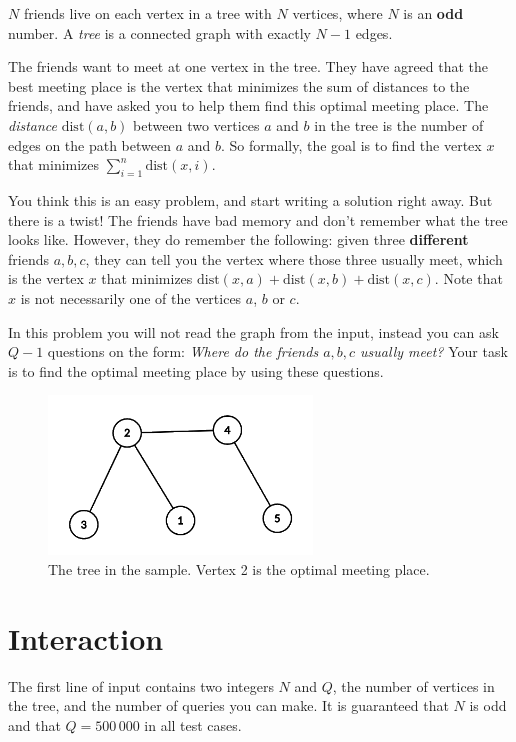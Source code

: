 $N$ friends live on each vertex in a tree with $N$ vertices, where $N$ is an \textbf{odd} number.
A \emph{tree} is a connected graph with exactly $N-1$ edges.

The friends want to meet at one vertex in the tree.
They have agreed that the best meeting place is the vertex that minimizes
the sum of distances to the friends, and have asked you to help them find 
this optimal meeting place.
The \emph{distance} $\text{dist}(a,b)$ between two vertices $a$ and $b$ in the tree is 
the number of edges on the path between $a$ and $b$.
So formally, the goal is to find the vertex $x$ that minimizes 
$\sum_{i=1}^{n} \text{dist}(x,i)$.

You think this is an easy problem, and start writing a solution right away.
But there is a twist!
The friends have bad memory and don't remember what the tree looks like.
However, they do remember the following: given three \textbf{different} friends 
$a,b,c$, they can tell you the vertex where those three usually meet, which is
the vertex $x$ that minimizes
$\text{dist}(x,a) +\text{dist}(x,b) +\text{dist}(x,c)$.
Note that $x$ is not necessarily one of the vertices $a$, $b$ or $c$.

In this problem you will not read the graph from the input, instead you can ask $Q-1$
questions on the form:
\emph{Where do the friends $a,b,c$ usually meet?}
Your task is to find the optimal meeting place by using these questions.

\begin{figure}[!h]
\begin{center}
  \includegraphics[width=7cm]{sample.png}
\end{center}
  \caption{The tree in the sample. Vertex 2 is the optimal meeting place.}
\end{figure}

\section*{Interaction}

The first line of input contains two integers $N$ and $Q$,
the number of vertices in the tree, and the number of queries you can make.
It is guaranteed that $N$ is odd and that $Q = 500\,000$ in all test cases.

